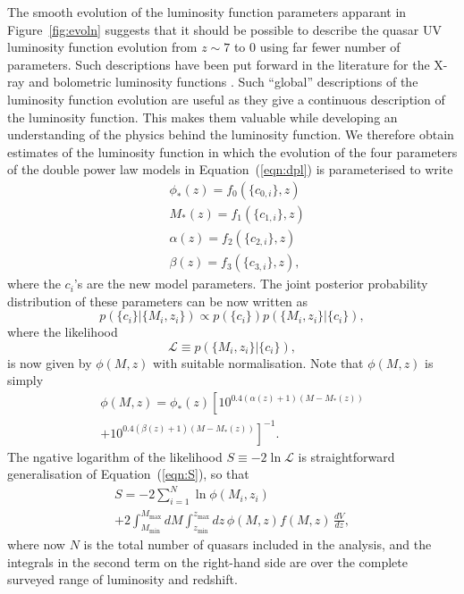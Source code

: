 \documentclass[a4paper,fleqn,usenatbib]{mnras}
\begin{document}
The smooth evolution of the luminosity function parameters apparant in
Figure~\ref{fig:evoln} suggests that it should be possible to describe
the quasar UV luminosity function evolution from $z\sim 7$ to $0$
using far fewer number of parameters.  Such descriptions have been put
forward in the literature for the X-ray and bolometric luminosity
functions \citep[e.g.,][]{2007ApJ...654..731H, 2015MNRAS.451.1892A}.
Such ``global'' descriptions of the luminosity function evolution are
useful as they give a continuous description of the luminosity
function.  This makes them valuable while developing an understanding
of the physics behind the luminosity function. We therefore obtain
estimates of the luminosity function in which the evolution of the
four parameters of the double power law models in
Equation~(\ref{eqn:dpl}) is parameterised to write
\begin{align}
  &\phi_*(z) = f_0(\{c_{0,i}\}, z)\nonumber\\
  &M_*(z) = f_1(\{c_{1,i}\}, z)\nonumber\\
  &\alpha(z) = f_2(\{c_{2,i}\}, z)\nonumber\\
  &\beta(z) = f_3(\{c_{3,i}\}, z),
\label{eqn:global}
\end{align}
where the $c_i$'s are the new model parameters.  The joint posterior
probability distribution of these parameters can be now written as
\begin{equation}
  p(\{c_i\} | \{M_i, z_i\}) \propto p(\{c_i\})p(\{M_i, z_i\} | \{c_i\}),
\end{equation}
where the likelihood 
\begin{equation}
  \mathcal{L}\equiv p(\{M_i, z_i\} | \{c_i\}),
\end{equation}
is now given by $\phi(M,z)$ with suitable normalisation.  Note that
$\phi(M,z)$ is simply 
\begin{multline}
  \phi(M,z) = \phi_*(z) \left[10^{0.4(\alpha(z)+1)(M-M_*(z))}\right. \\ \left.+ 10^{0.4(\beta(z)+1)(M-M_*(z))}\right]^{-1}.
\end{multline}
The ngative logarithm of the likelihood $S\equiv -2\ln\mathcal{L}$ is
straightforward generalisation of Equation~(\ref{eqn:S}), so that
\begin{multline}
  S = -2\sum_{i=1}^N\ln\phi(M_i, z_i)\\+2\int_{M_\mathrm{min}}^{M_\mathrm{max}}dM\int_{z_\mathrm{min}}^{z_\mathrm{max}}dz\, \phi(M,z) f(M, z)\,\frac{dV}{dz},
  \label{eqn:S2}
\end{multline}
where now $N$ is the total number of quasars included in the analysis,
and the integrals in the second term on the right-hand side are over
the complete surveyed range of luminosity and redshift.
\end{document}
